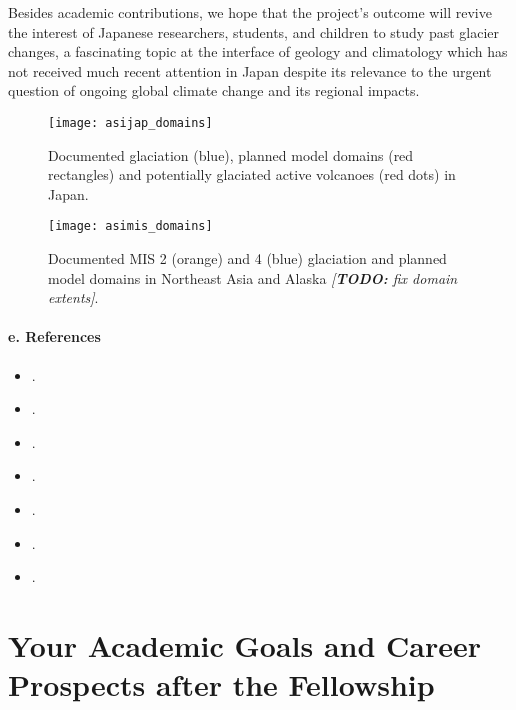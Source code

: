 \documentclass{article}
\newcommand{\todo}[1]{\textcolor{c3}{\emph{[\textbf{TODO:} #1]}}}
\begin{document}
    Besides academic contributions, we hope that the project's outcome will
    revive the interest of Japanese researchers, students, and children to
    study past glacier changes, a fascinating topic at the interface of geology
    and climatology which has not received much recent attention in Japan
    despite its relevance to the urgent question of ongoing global climate
    change and its regional impacts.

    \begin{figure}[p]
      \centerline{\texttt{[image: asijap\_domains]}}
      \caption{%
        Documented glaciation (blue), planned model domains (red rectangles)
        and potentially glaciated active volcanoes (red dots) in Japan.}
      \label{fig:japan}
    \end{figure}

    \begin{figure}[p]
      \centerline{\texttt{[image: asimis\_domains]}}
      \caption{%
        Documented MIS 2 (orange) and 4 (blue) glaciation and planned model
        domains in Northeast Asia and Alaska \todo{fix domain extents}.}
      \label{fig:asia}
    \end{figure}

\paragraph{e. References}

    \begin{itemize}
      \item{}.
      \item{}.
      \item{}.
      \item{}.
      \item{}.
      \item{}.
      \item{}.
    \end{itemize}


\section{Your Academic Goals and Career Prospects after the Fellowship}
\end{document}
